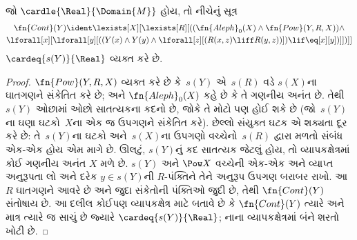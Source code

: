 \begin{prop}
જો $\cardle{\Real}{\Domain{M}}$ હોય, તો નીચેનું સૂત્ર
\begin{multline*}
\fn{Cont}(Y) \ident
\lexists[X][\lexists[R][((\fn{Aleph}_0(X) \land
      \fn{Pow}(Y, R, X)) \land \\ 
      \lforall[x][\lforall[y][((Y(x) \land {}
      Y(y) \land \lforall[z][(R(x,z) \liff R(y,z))]) \lif \eq[x][y])]])]]
\end{multline*}
$\cardeq{s(Y)}{\Real}$ વ્યક્ત કરે છે.
\end{prop}

\begin{proof}
$\fn{Pow}(Y, R, X)$ વ્યક્ત કરે છે કે~$s(Y)$ એ~$s(R)$ વડે
$s(X)$ના ઘાતગણને સંકેતિત કરે છે; અને
$\fn{Aleph}_0(X)$ કહે છે કે તે ગણનીય અનંત છે. તેથી~$s(Y)$
ઓછામાં ઓછો સાતત્યકના કદનો છે, જોકે તે મોટો પણ હોઈ શકે છે
(જો~$s(Y)$ના ઘણા ઘટકો~$X$ના એક જ ઉપગણને સંકેતિત કરે).
છેલ્લો સંયુક્ત ઘટક એ શક્યતા દૂર કરે છે: તે~$s(Y)$ના ઘટકો અને~$s(X)$ના
ઉપગણો વચ્ચેનો~$s(R)$ દ્વારા મળતો સંબંધ એક-એક હોય એમ માગે છે.
ઊલટું, $s(Y)$નું કદ સાતત્યક જેટલું હોય, તો વ્યાપકક્ષેત્રમાં
કોઈ ગણનીય અનંત $X$ મળે છે. $s(Y)$ અને $\Pow X$ વચ્ચેની
એક-એક અને વ્યાપ્ત અનુરૂપતા લો અને દરેક $y\in s(Y)$ની $R$-પંક્તિને
તેને અનુરૂપ ઉપગણ બરાબર રાખો. આ $R$ ઘાતગણને આવરે છે અને
જુદા સંકેતોની પંક્તિઓ જુદી છે, તેથી $\fn{Cont}(Y)$ સંતોષાય છે.
આ દલીલ કોઈપણ વ્યાપકક્ષેત્ર માટે બતાવે છે કે $\fn{Cont}(Y)$
ત્યારે અને માત્ર ત્યારે જ સાચું છે જ્યારે $\cardeq{s(Y)}{\Real}$;
નાના વ્યાપકક્ષેત્રમાં બંને શરતો ખોટી છે.
\end{proof}

